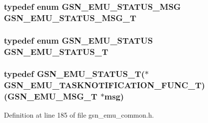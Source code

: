 \label{a00490_a930ae11cb1c9d2d92a1e706db09effbf}
\hypertarget{a00490_a0dc41bc6ddae5366da792644baa62929}{
\subsubsection[{GSN\_\-EMU\_\-STATUS\_\-MSG\_\-T}]{\setlength{\rightskip}{0pt plus 5cm}typedef enum {\bf GSN\_\-EMU\_\-STATUS\_\-MSG} {\bf GSN\_\-EMU\_\-STATUS\_\-MSG\_\-T}}}
\label{a00490_a0dc41bc6ddae5366da792644baa62929}
\hypertarget{a00490_aeda27e2bd7f74b1b9748e313d272033e}{
\subsubsection[{GSN\_\-EMU\_\-STATUS\_\-T}]{\setlength{\rightskip}{0pt plus 5cm}typedef enum {\bf GSN\_\-EMU\_\-STATUS} {\bf GSN\_\-EMU\_\-STATUS\_\-T}}}
\label{a00490_aeda27e2bd7f74b1b9748e313d272033e}
\hypertarget{a00490_a05b3306759ea16994bc2d9055424367e}{
\subsubsection[{GSN\_\-EMU\_\-TASKNOTIFICATION\_\-FUNC\_\-T}]{\setlength{\rightskip}{0pt plus 5cm}typedef {\bf GSN\_\-EMU\_\-STATUS\_\-T}($\ast$  {\bf GSN\_\-EMU\_\-TASKNOTIFICATION\_\-FUNC\_\-T})({\bf GSN\_\-EMU\_\-MSG\_\-T} $\ast$msg)}}
\label{a00490_a05b3306759ea16994bc2d9055424367e}


Definition at line 185 of file gsn\_\-emu\_\-common.h.



